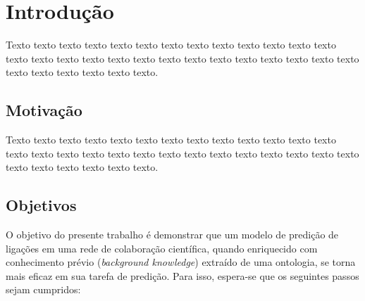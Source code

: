 \chapter{Introdução}
\label{cap:introducao}

Texto texto texto texto texto texto texto texto texto texto texto texto texto
texto texto texto texto texto texto texto texto texto texto texto texto texto
texto texto texto texto texto texto texto.



\section{Motivação}
\label{sec:motivacao}

Texto texto texto texto texto texto texto texto texto texto texto texto texto
texto texto texto texto texto texto texto texto texto texto texto texto texto
texto texto texto texto texto texto texto.


\section{Objetivos}
\label{sec:objetivos}

O objetivo do presente trabalho é demonstrar que um modelo de predição de ligações em uma rede de colaboração científica, quando enriquecido com conhecimento prévio (\textit{background knowledge}) extraído de uma ontologia, se torna mais eficaz em sua tarefa de predição.
Para isso, espera-se que os seguintes passos sejam cumpridos:

